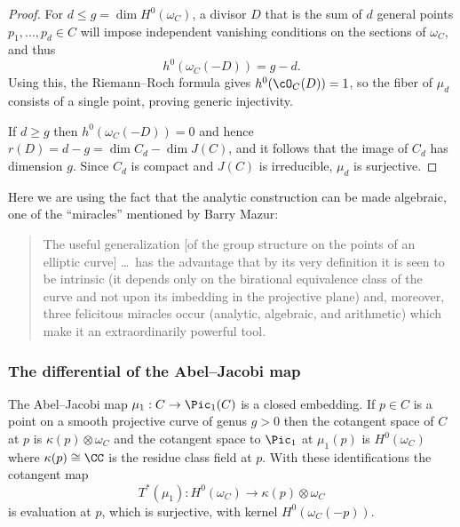 \begin{proof}
For $d\leq g = \dim H^{0}(\omega_{C})$,  a divisor $D$ that is the sum of $d$ general points $p_{1}, \dots,  p_{d} \in C$ will impose independent vanishing conditions on the sections of $\omega_{C}$, and thus
$$
h^0(\omega_C(-D)) = g-d.
$$
 Using this, the
%
Riemann--Roch formula
gives $h^{0}(\cO_{C}(D)) = 1$, so the fiber of
$\mu_{d}$ consists of a single point, proving generic injectivity.

If $d \geq g$ then $h^0(\omega_C(-D)) = 0$ and hence $r(D) = d-g= \dim C_{d} - \dim J(C)$, and it follows that the image of $C_d$ has dimension $g$. Since $C_d$ is compact and $J(C)$ is irreducible, $\mu_{d}$ is surjective.
\end{proof}

Here we are using the fact that the analytic construction can be made algebraic, one of the ``miracles''
mentioned by
Barry Mazur:
%
\begin{quote}
The useful generalization [of the group structure on the points of an
\null elliptic curve]
\dots\ has the advantage that by its
very definition it is seen to be intrinsic (it depends only on the birational
equivalence class of the curve and not upon its imbedding in the projective
plane) and, moreover, three felicitous miracles occur (analytic, algebraic, and
arithmetic) which make it an extraordinarily powerful tool.
\\
\vrule width0pt\hfill \null\emdash  \cite{MazurBulletin}
\end{quote}

\subsubsection*{The differential of the Abel--Jacobi map}

\begin{theorem}
The Abel--Jacobi map
%
$\mu_{1}: C\to \Pic_{1}(C)$ is a closed embedding.
If $p\in C$ is a point on a smooth projective curve of genus $g>0$ then the
%
cotangent space
of $C$
at $p$ is $\kappa(p) \otimes \omega_{C}$ and the cotangent space to $\Pic_{1}$ at $\mu_{1}(p)$ is
$H^{0}(\omega_{C})$ where $\kappa(p) \cong \CC$ is the residue class
field at $p$. With these identifications the
cotangent map
%
$$
T^{*}(\mu_{1}): H^{0}(\omega_{C})  \to \kappa(p) \otimes \omega_{C}
$$
is evaluation at $p$, which is surjective, with kernel
$H^{0}(\omega_{C}(-p))$.
\end{theorem}



